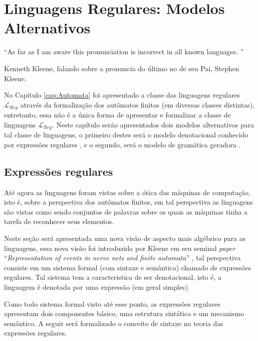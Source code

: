 \chapter{Linguagens Regulares: Modelos Alternativos}\label{cap:ExpressionsGrammars}

\epigraph{``As far as I am aware this pronunciation is incorrect in all known languages. ''}{Kenneth Kleene, falando sobre a pronuncia do último no de seu Pai, Stephen Kleene.}

No Capítulo \ref{cap:Automata} foi apresentado a classe das linguagens regulares $\mathcal{L}_{Reg}$ através da formalização dos autômatos finitos (em diversas classes distintas), entretanto, essa não é a única forma de apresentar e formalizar a classe de linguagens $\mathcal{L}_{Reg}$. Neste capítulo serão apresentados dois modelos alternativos para tal classe de linguagens, o primeiro destes será o modelo denotacional conhecido por expressões regulares \cite{menezes1998LFA}, e o segundo, será o modelo de gramática geradora \cite{chomsky1956}.

\section{Expressões regulares}\label{sec:ExpressionsRegulares}

Até agora as linguagens foram vistas sobre a ótica das máquinas de computação, isto é, sobre a perspectiva dos autômatos finitos, em tal perspectiva as linguagens são vistas como sendo conjuntos de palavras sobre os quais as máquinas tinha a tarefa de reconhecer seus elementos. 

Neste seção será apresentada uma nova visão de aspecto mais algébrico para as linguagens, essa nova visão foi introduzida por Kleene em seu seminal \textit{paper} ``\textit{Representation of events in nerve nets and finite automata}'' \cite{kleene1951}, tal perspectiva consiste em um sistema formal (com sintaxe e semântica) chamado de expressões  regulares. Tal sistema tem a caracteristica de ser denotacional, isto é, a linguagem é denotada por uma expressão (em geral simples).

Como todo sistema formal visto até esse ponto, as expressões regulares apresentam dois componentes básico, uma estrutura sintática e um mecanismo semântico. A seguir será formalizado o conceito de sintaxe na teoria das expressões regulares.

